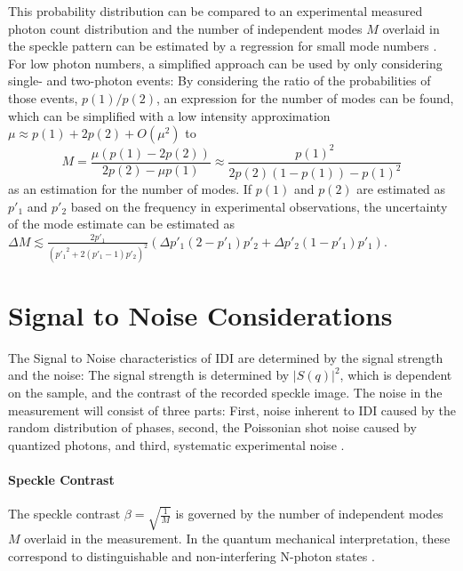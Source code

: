 This probability distribution can be compared to an experimental measured photon count distribution and the number of independent modes $M$ overlaid in the speckle pattern can be estimated by a regression for small mode numbers \cite{lehmkuhler2014,yun2019}. 
For low photon numbers, a simplified approach can be used by only considering single- and two-photon events: By considering the ratio of the probabilities of those events, $p(1) / p(2)$,  an expression for the number of modes can be found, which can be simplified with a low intensity approximation $\mu\approx p(1)+2p(2)+O(\mu^2)$ to 
\begin{equation}
	M=\frac{\mu  (p(1)-2 p(2))}{2 p(2)-\mu  p(1)}\approx \frac{p(1)^2}{2 p(2) (1-p(1))-p(1)^2}
	\label{eq:modesp1p2}
\end{equation}
as an estimation for the number of modes.
If $p(1)$ and $p(2)$ are estimated as $p'_1$ and $p'_2$ based on the frequency in experimental observations, the uncertainty of the mode estimate can be estimated as 
$\Delta M \lesssim \frac{2 p'_1}{\left({p'_1}^2+2 (p'_1-1) p'_2\right)^2} \left(\Delta p'_1 (2-p'_1) p'_2+\Delta p'_2 (1-p'_1) p'_1\right)$.

\section{Signal to Noise Considerations}
\label{sec:specklecontrast}
The Signal to Noise characteristics of IDI are determined by the signal strength and the noise:
The signal strength is determined by $\left|S(q)\right|^2$, which is dependent on the sample, and the contrast of the recorded speckle image. The noise in the measurement will consist of three parts: First, noise inherent to IDI caused by the random distribution of phases, second, the Poissonian shot noise caused by quantized photons, and third, systematic experimental noise \cite{trost2020, goodman2007}. 

\paragraph{Speckle Contrast}
The speckle contrast $\beta =\sqrt{\tfrac{1}{M}}$ is governed by the number of independent modes $M$ overlaid in the measurement. In the quantum mechanical interpretation, these correspond to distinguishable and non-interfering N-photon states \cite{goodman2000,ou2017,classen2019}.

